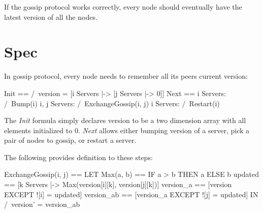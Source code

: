 If the gossip protocol works correctly, every node should eventually have the
latest version of all the nodes.

\section{Spec}

In gossip protocol, every node needs to remember all its peers current
version:\newline

\begin{tla}
Init ==
    /\ version = [i \in Servers |-> [j \in Servers |-> 0]]
Next ==
    \/ \E i \in Servers:
        /\ Bump(i)
    \/ \E i, j \in Servers:
        /\ ExchangeGossip(i, j)
    \/ \E i \in Servers:
        /\ Restart(i)
\end{tla}
\begin{tlatex}
%
%
%
%
%
%
%
%
\end{tlatex}
\newline

The \textit{Init} formula simply declares version to be a two dimension array
with all elements initialized to 0. \textit{Next} allows either bumping version
of a server, pick a pair of nodes to gossip, or restart a server.\newline

The following provides definition to these steps:\newline

\begin{tla}
ExchangeGossip(i, j) == 
    LET 
        Max(a, b) == IF a > b THEN a ELSE b
        updated == [k \in Servers |-> Max(version[i][k], version[j][k])]
        version_a == [version EXCEPT ![i] = updated]
        version_ab == [version_a EXCEPT ![j] = updated]
    IN 
        /\ version' = version_ab 
\end{tla}
\begin{tlatex}
%
%
%
%
\end{tlatex}
\newline

